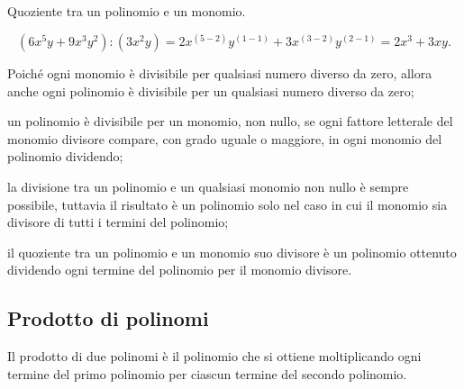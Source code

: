 \begin{exrig}
 \begin{esempio}
 Quoziente tra un polinomio e un monomio.
 
\[\left(6x^{5}y+9x^{3}y^{2}\right):\left(3x^{2}y\right)=2x^{(5-2)}y^{(1-1)}
+3x^{(3-2)}y^{(2-1)}=2x^{3}+3{xy}.\]
 \end{esempio}
\end{exrig}
\osservazione

\begin{enumeratea}
\item Poiché ogni monomio è divisibile per qualsiasi numero diverso
da zero, allora anche ogni polinomio è divisibile per un qualsiasi
numero diverso da zero;
\item un polinomio è divisibile per un monomio, non nullo, se ogni
fattore letterale del monomio divisore compare, con grado uguale o
maggiore, in ogni monomio del polinomio dividendo;
\item la divisione tra un polinomio e un qualsiasi monomio non nullo è
sempre possibile, tuttavia il risultato è un polinomio solo nel caso
in cui il monomio sia divisore di tutti i termini del polinomio;
\item il quoziente tra un polinomio e un monomio suo divisore è un
polinomio ottenuto dividendo ogni termine del polinomio per il monomio
divisore.
\end{enumeratea}


\subsection{Prodotto di polinomi}
\label{subsec:10_poli_prodotto}

Il prodotto di due polinomi è il polinomio che si ottiene
moltiplicando ogni termine del primo polinomio per ciascun termine del
secondo polinomio.

